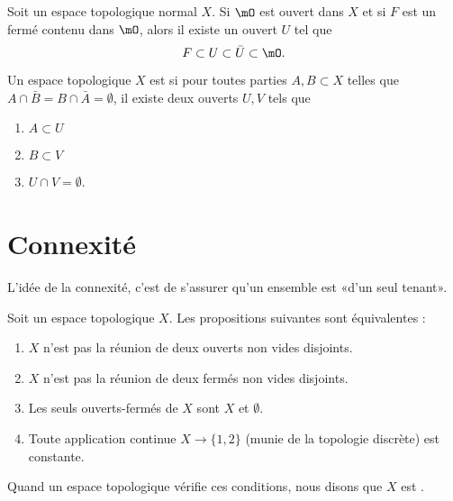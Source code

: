 \begin{lemma}        \label{LEMooVVASooEXYKOZ}
	Soit un espace topologique normal \( X\). Si \( \mO\) est ouvert dans \( X\) et si \( F\) est un fermé contenu dans \( \mO\), alors il existe un ouvert \( U\) tel que
	\begin{equation}
		F\subset U\subset\bar U\subset \mO.
	\end{equation}
\end{lemma}

\begin{definition}	\label{DEFooTLVHooYWvDIu}
	Un espace topologique \( X\) est  si pour toutes parties \( A,B\subset X\) telles que \( A\cap\bar B=B\cap\bar A=\emptyset\), il existe deux ouverts \( U,V\) tels que
	\begin{enumerate}
		\item
		      \( A\subset U\)
		\item
		      \( B\subset V\)
		\item
		      \( U\cap V=\emptyset\).
	\end{enumerate}
\end{definition}



\section{Connexité}

L'idée de la connexité, c'est de s'assurer qu'un ensemble est «d'un seul tenant».

\begin{propositionDef}	\label{PROPooNLXDooVTZLan}
	Soit un espace topologique \( X\). Les propositions suivantes sont équivalentes :
	\begin{enumerate}
		\item
		      \( X\) n'est pas la réunion de deux ouverts non vides disjoints.
		\item
		      \( X\) n'est pas la réunion de deux fermés non vides disjoints.
		\item
		      Les seuls ouverts-fermés de \( X\) sont \( X\) et \( \emptyset\).
		\item
		      Toute application continue \( X\to\{ 1,2 \}\) (munie de la topologie discrète) est constante.
	\end{enumerate}
	Quand un espace topologique vérifie ces conditions, nous disons que \( X\) est .
\end{propositionDef}

